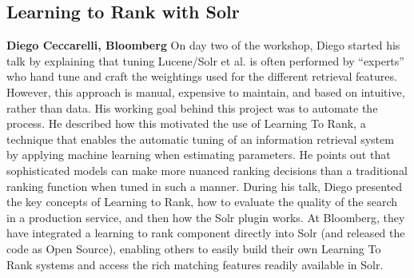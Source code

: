 \subsection*{Learning to Rank with Solr} 
{\bf Diego Ceccarelli, Bloomberg}
On day two of the workshop, Diego started his talk by explaining that tuning Lucene/Solr et al. is often performed by ``experts'' who hand tune and craft the weightings used for the different retrieval features. However, this approach is manual, expensive to maintain, and based on intuitive, rather than data. His working goal behind this project was to automate the process. He described how this motivated the use of Learning To Rank, a technique that enables the automatic tuning of an information retrieval system by applying machine learning when estimating parameters. He points out that sophisticated models can make more nuanced ranking decisions than a traditional ranking function when tuned in such a manner. During his talk, Diego presented the key concepts of Learning to Rank, how to evaluate the quality of the search in a production service, and then how the Solr plugin works. At Bloomberg, they have integrated a learning to rank component directly into Solr (and released the code as Open Source), enabling others to easily build their own Learning To Rank systems and access the rich matching features readily available in Solr. 



